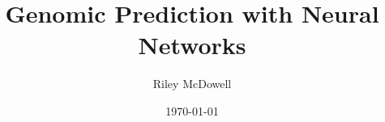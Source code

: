 \documentclass[12pt]{report}
\begin{document}
\title{Genomic Prediction with Neural Networks}
\author{Riley McDowell}
\date{\today}
\maketitle



\end{document}
